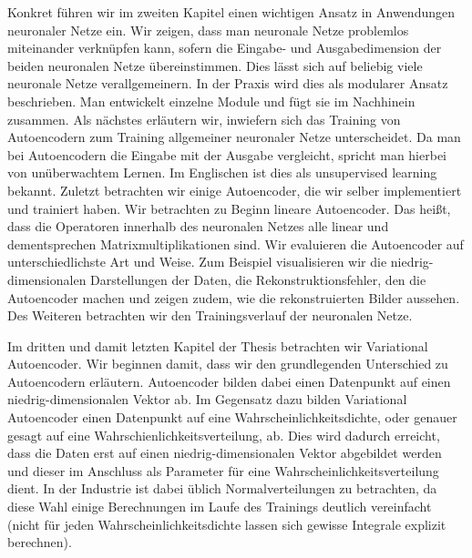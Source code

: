 \documentclass[11pt, twoside, a4paper]{book}
\theoremstyle{plain}
\theoremstyle{definition}
\theoremstyle{plain}
\begin{document}
Konkret führen wir im zweiten Kapitel einen wichtigen Ansatz in Anwendungen neuronaler Netze ein. Wir zeigen, dass man neuronale Netze problemlos miteinander verknüpfen kann, sofern die Eingabe- und Ausgabedimension der beiden neuronalen Netze übereinstimmen. Dies lässt sich auf beliebig viele neuronale Netze verallgemeinern. In der Praxis wird dies als \glqq modularer Ansatz\grqq{} beschrieben. Man entwickelt einzelne Module und fügt sie im Nachhinein zusammen.
Als nächstes erläutern wir, inwiefern sich das Training von Autoencodern zum Training allgemeiner neuronaler Netze unterscheidet. Da man bei Autoencodern die Eingabe mit der Ausgabe vergleicht, spricht man hierbei von unüberwachtem Lernen. Im Englischen ist dies als \glqq unsupervised learning\grqq{} bekannt. Zuletzt betrachten wir einige Autoencoder, die wir selber implementiert und trainiert haben. Wir betrachten zu Beginn lineare Autoencoder. Das heißt, dass die Operatoren innerhalb des neuronalen Netzes alle linear und dementsprechen Matrixmultiplikationen sind. Wir evaluieren die Autoencoder auf unterschiedlichste Art und Weise. Zum Beispiel visualisieren wir die niedrig-dimensionalen Darstellungen der Daten, die Rekonstruktionsfehler, den die Autoencoder machen und zeigen zudem, wie die rekonstruierten Bilder aussehen. Des Weiteren betrachten wir den Trainingsverlauf der neuronalen Netze.

Im dritten und damit letzten Kapitel der Thesis betrachten wir Variational Autoencoder. Wir beginnen damit, dass wir den grundlegenden Unterschied zu Autoencodern erläutern. Autoencoder bilden dabei einen Datenpunkt auf einen niedrig-dimensionalen Vektor ab. Im Gegensatz dazu bilden Variational Autoencoder einen Datenpunkt auf eine Wahrscheinlichkeitsdichte, oder genauer gesagt auf eine Wahrschienlichkeitsverteilung, ab. Dies wird dadurch erreicht, dass die Daten erst auf einen niedrig-dimensionalen Vektor abgebildet werden und dieser im Anschluss als Parameter für eine Wahrscheinlichkeitsverteilung dient. In der Industrie ist dabei üblich Normalverteilungen zu betrachten, da diese Wahl einige Berechnungen im Laufe des Trainings deutlich vereinfacht (nicht für jeden Wahrscheinlichkeitsdichte lassen sich gewisse Integrale explizit berechnen).
\end{document}

